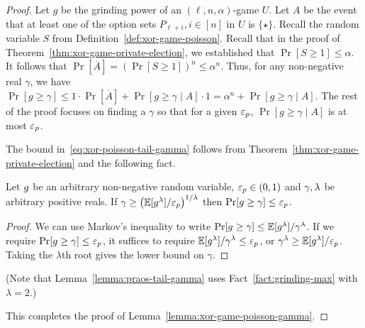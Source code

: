   \begin{proof}
      Let $g$ be the grinding power of an $(\ell, n, \alpha)$-game $U$.
      Let $A$ be the event that 
      at least one of the option sets $P_{\ell + i}, i \in [n]$ in $U$ is $\{\star\}$. 
      Recall the random variable $S$ from Definition~\ref{def:xor-game-poisson}. 
      Recall that in the proof of Theorem~\ref{thm:xor-game-private-election}, 
      we established that $\Pr[S \geq 1] \leq \alpha$. 
      It follows that $\Pr[\overline{A}] = (\Pr[S \geq 1])^n \leq \alpha^n$. 
      Thus, for any non-negative real $\gamma$, 
      we have 
      $
      \Pr[g \geq \gamma] 
      \leq 1 \cdot \Pr[\overline{A}] + \Pr[g \geq \gamma \mid A] \cdot 1
      = \alpha^n + \Pr[g \geq \gamma \mid A]
      $. 
      The rest of the proof focuses on finding a $\gamma$ so that 
      for a given $\mathsf{\varepsilon}_p$, 
      $\Pr[g \geq \gamma \mid A]$ is at most $\mathsf{\varepsilon}_p$. 

      The bound in~\eqref{eq:xor-poisson-tail-gamma} follows from 
      Theorem~\ref{thm:xor-game-private-election} and the following fact.

      \begin{fact}\label{fact:grinding-max}
          Let $g$ be an arbitrary non-negative random variable, 
          $\mathsf{\varepsilon}_p \in (0, 1)$ and 
          $\gamma, \lambda$ be arbitrary positive reals. 
          If $
              \gamma \geq \left( \operatorname{\mathbb{E}}[g^\lambda]/\mathsf{\varepsilon}_p \right)^{1/\lambda}
          $
          then $\Pr[g \geq \gamma] \leq \mathsf{\varepsilon}_p$.    
      \end{fact}
      \begin{proof}
          We can use Markov's inequality to write 
          $
              \Pr[g \geq \gamma] \leq \operatorname{\mathbb{E}}[g^\lambda]/\gamma^\lambda
          $.
          If we require $\Pr[g \geq \gamma] \leq \mathsf{\varepsilon}_p$, 
          it suffices to require 
          $\operatorname{\mathbb{E}}[g^\lambda]/\gamma^\lambda \leq \mathsf{\varepsilon}_p$, or
          $\gamma^\lambda \geq \operatorname{\mathbb{E}}[g^\lambda]/\mathsf{\varepsilon}_p$. 
          Taking the $\lambda$th root gives the lower bound on $\gamma$.
      \end{proof}
      \noindent
      (Note that Lemma~\ref{lemma:praos-tail-gamma} uses Fact~\ref{fact:grinding-max} 
      with $\lambda = 2$.)

      This completes the proof of Lemma~\ref{lemma:xor-game-poisson-gamma}.
  \end{proof}


